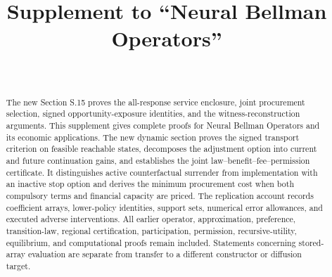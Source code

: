 \documentclass[ecta]{econsocart}
\begin{document}
\begin{frontmatter}
\title{Supplement to ``Neural Bellman Operators''}
\begin{aug}
\author[id=au1,addressref={add1}]{~}
\address[id=add1]{}
\end{aug}
\begin{abstract}
The new Section S.15 proves the all-response service enclosure, joint procurement selection, signed opportunity-exposure identities, and the witness-reconstruction arguments. This supplement gives complete proofs for Neural Bellman Operators and its economic applications. The new dynamic section proves the signed transport criterion on feasible reachable states, decomposes the adjustment option into current and future continuation gains, and establishes the joint law--benefit--fee--permission certificate. It distinguishes active counterfactual surrender from implementation with an inactive stop option and derives the minimum procurement cost when both compulsory terms and financial capacity are priced. The replication account records coefficient arrays, lower-policy identities, support sets, numerical error allowances, and executed adverse interventions. All earlier operator, approximation, preference, transition-law, regional certification, participation, permission, recursive-utility, equilibrium, and computational proofs remain included. Statements concerning stored-array evaluation are separate from transfer to a different constructor or diffusion target.
\end{abstract}
\end{frontmatter}
















\end{document}

